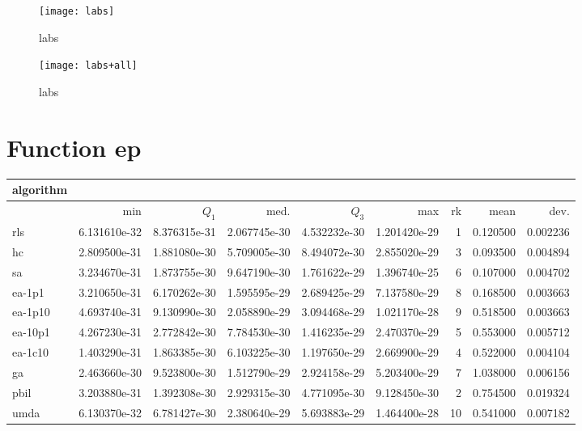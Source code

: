 \begin{center}
\begin{figure}[h]
\centering
\texttt{[image: labs]}
\caption{labs}
\end{figure}
\end{center}

\begin{center}
\begin{figure}[h]
\centering
\texttt{[image: labs+all]}
\caption{labs}
\end{figure}
\end{center}

\newpage

\section{Function ep}
\begin{center}
\begin{tabular}{@{}l*{5}{>{{}}N{1}{1}}>{{}}N{2}{0}N{1}{3}N{1}{3}@{}}
\toprule
{algorithm} &  &  \\
\midrule
& {min} & {$Q_1$} & {med.} & {$Q_3$} & {max} & {rk} & {mean} & {dev.} \\
\midrule
rls & 6.131610e-32 & {\color{blue}} 8.376315e-31 & {\color{blue}} 2.067745e-30 & {\color{blue}} 4.532232e-30 & 1.201420e-29 & 1 & 0.120500 & 0.002236 \\
 hc & 2.809500e-31 & 1.881080e-30 & 5.709005e-30 & 8.494072e-30 & 2.855020e-29 & 3 & 0.093500 & 0.004894 \\
 sa & 3.234670e-31 & 1.873755e-30 & 9.647190e-30 & 1.761622e-29 & 1.396740e-25 & 6 & 0.107000 & 0.004702 \\
 ea-1p1 & 3.210650e-31 & 6.170262e-30 & 1.595595e-29 & 2.689425e-29 & 7.137580e-29 & 8 & 0.168500 & 0.003663 \\
 ea-1p10 & 4.693740e-31 & 9.130990e-30 & 2.058890e-29 & 3.094468e-29 & 1.021170e-28 & 9 & 0.518500 & 0.003663 \\
 ea-10p1 & 4.267230e-31 & 2.772842e-30 & 7.784530e-30 & 1.416235e-29 & 2.470370e-29 & 5 & 0.553000 & 0.005712 \\
 ea-1c10 & 1.403290e-31 & 1.863385e-30 & 6.103225e-30 & 1.197650e-29 & 2.669900e-29 & 4 & 0.522000 & 0.004104 \\
 ga & 2.463660e-30 & 9.523800e-30 & 1.512790e-29 & 2.924158e-29 & 5.203400e-29 & 7 & 1.038000 & 0.006156 \\
 pbil & 3.203880e-31 & 1.392308e-30 & 2.929315e-30 & 4.771095e-30 & {\color{blue}} 9.128450e-30 & 2 & 0.754500 & 0.019324 \\
 umda & {\color{blue}} 6.130370e-32 & 6.781427e-30 & 2.380640e-29 & 5.693883e-29 & 1.464400e-28 & 10 & 0.541000 & 0.007182 \\
 \bottomrule
\end{tabular}
\end{center}


